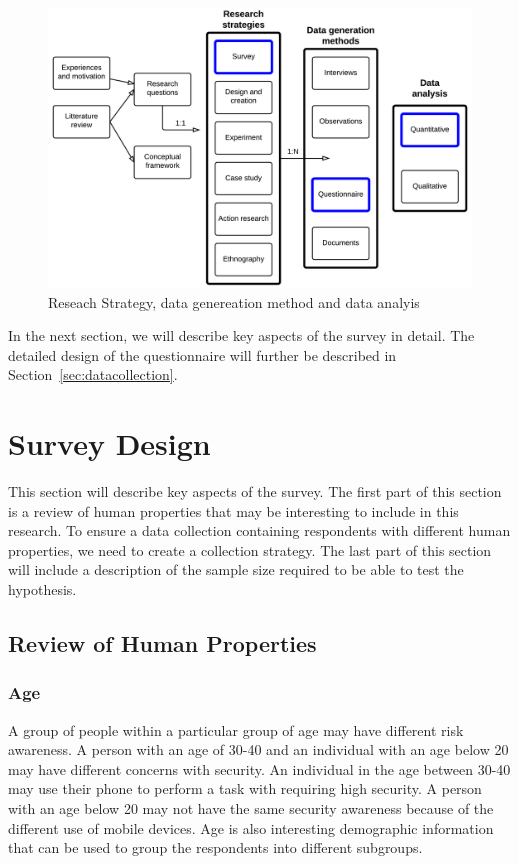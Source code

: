   \begin{figure}[H]
    \centering
    \includegraphics[scale=0.15]{pics/ResearchProcess2.png}
    \caption[Reseach Strategy, data genereation method and data analyis]{Reseach Strategy, data genereation method and data analyis \cite{empiriske}}
    \label{fig:researchProcess2}
  \end{figure}
  
  In the next section, we will describe key aspects of the survey in detail. The detailed design of the questionnaire will further be described in Section~\ref{sec:datacollection}.

  \section{Survey Design}

  This section will describe key aspects of the survey. The first part of this section is a review of human properties that may be interesting to include in this research. To ensure a data collection containing respondents with different human properties, we need to create a collection strategy. The last part of this section will include a description of the sample size required to be able to test the hypothesis. 

    \subsection{Review of Human Properties} \label{sec:datarequirements}

      \subsubsection*{Age}
      A group of people within a particular group of age may have different risk awareness. A person with an age of 30-40 and an individual with an age below 20 may have different concerns with security. An individual in the age between 30-40 may use their phone to perform a task with requiring high security. A person with an age below 20 may not have the same security awareness because of the different use of mobile devices. Age is also interesting demographic information that can be used to group the respondents into different subgroups.

